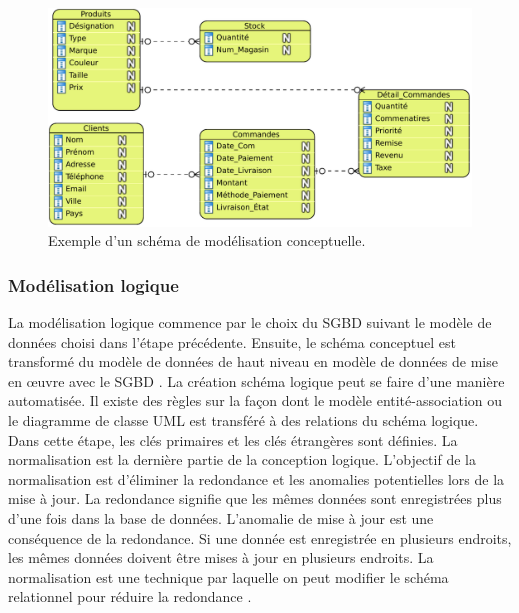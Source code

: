 \begin{figure}
\begin{center}
\includegraphics[scale=0.6]{chapitre2/chap2Fig/conceptual-design-ex.pdf}
\caption{Exemple d'un schéma de modélisation conceptuelle.}
\label{fig:conceptual-design-ex}
\end{center}
\end{figure}

\subsubsection{Modélisation logique}
La modélisation logique commence par le choix du SGBD suivant le modèle de données choisi dans l'étape précédente. Ensuite, le schéma conceptuel est transformé du modèle de données de haut niveau en modèle de données de mise en œuvre avec le SGBD \cite{Elmasri08}.
La création schéma logique peut se faire d'une manière automatisée. Il existe des règles sur la façon dont le modèle entité-association ou le diagramme de classe UML est transféré à des relations du schéma logique. Dans cette étape, les clés primaires et les clés étrangères sont définies.
La normalisation est la dernière partie de la conception logique. L'objectif de la normalisation est d'éliminer la redondance et les anomalies potentielles lors de la mise à jour. La redondance signifie que les mêmes données sont enregistrées plus d'une fois dans la base de données. L'anomalie de mise à jour est une conséquence de la redondance. Si une donnée est enregistrée en plusieurs endroits, les mêmes données doivent être mises à jour en plusieurs endroits. La normalisation est une technique par laquelle on peut modifier le schéma relationnel pour réduire la redondance \cite{Elmasri08}.


